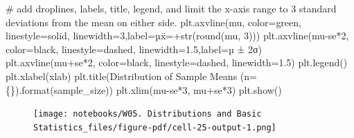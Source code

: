 \documentclass[
  letterpaper,
  DIV=11,
  numbers=noendperiod]{scrreprt}
\newenvironment{Shaded}{\begin{snugshade}}{\end{snugshade}}
\newcommand{\BuiltInTok}[1]{\textcolor[rgb]{0.00,0.23,0.31}{#1}}
\newcommand{\CommentTok}[1]{\textcolor[rgb]{0.37,0.37,0.37}{#1}}
\newcommand{\DecValTok}[1]{\textcolor[rgb]{0.68,0.00,0.00}{#1}}
\newcommand{\FloatTok}[1]{\textcolor[rgb]{0.68,0.00,0.00}{#1}}
\newcommand{\NormalTok}[1]{\textcolor[rgb]{0.00,0.23,0.31}{#1}}
\newcommand{\OperatorTok}[1]{\textcolor[rgb]{0.37,0.37,0.37}{#1}}
\newcommand{\SpecialCharTok}[1]{\textcolor[rgb]{0.37,0.37,0.37}{#1}}
\newcommand{\StringTok}[1]{\textcolor[rgb]{0.13,0.47,0.30}{#1}}
\begin{document}
\begin{Shaded}
\begin{Highlighting}[]
    \CommentTok{\# add droplines, labels, title, legend, and limit the x{-}axis range to 3 standard deviations from the mean on either side.}
\NormalTok{    plt.axvline(mu, color}\OperatorTok{=}\StringTok{\textquotesingle{}green\textquotesingle{}}\NormalTok{, linestyle}\OperatorTok{=}\StringTok{\textquotesingle{}solid\textquotesingle{}}\NormalTok{, linewidth}\OperatorTok{=}\DecValTok{3}\NormalTok{,label}\OperatorTok{=}\StringTok{\textquotesingle{}µx̄=\textquotesingle{}}\OperatorTok{+}\BuiltInTok{str}\NormalTok{(}\BuiltInTok{round}\NormalTok{(mu, }\DecValTok{3}\NormalTok{)))}
\NormalTok{    plt.axvline(mu}\OperatorTok{{-}}\NormalTok{se}\OperatorTok{*}\DecValTok{2}\NormalTok{, color}\OperatorTok{=}\StringTok{\textquotesingle{}black\textquotesingle{}}\NormalTok{, linestyle}\OperatorTok{=}\StringTok{\textquotesingle{}dashed\textquotesingle{}}\NormalTok{, linewidth}\OperatorTok{=}\FloatTok{1.5}\NormalTok{,label}\OperatorTok{=}\StringTok{\textquotesingle{}µ ± 2σ\textquotesingle{}}\NormalTok{)}
\NormalTok{    plt.axvline(mu}\OperatorTok{+}\NormalTok{se}\OperatorTok{*}\DecValTok{2}\NormalTok{, color}\OperatorTok{=}\StringTok{\textquotesingle{}black\textquotesingle{}}\NormalTok{, linestyle}\OperatorTok{=}\StringTok{\textquotesingle{}dashed\textquotesingle{}}\NormalTok{, linewidth}\OperatorTok{=}\FloatTok{1.5}\NormalTok{)}
\NormalTok{    plt.legend()}
\NormalTok{    plt.xlabel(xlab)    }
\NormalTok{    plt.title(}\StringTok{\textquotesingle{}Distribution of Sample Means (n=}\SpecialCharTok{\{\}}\StringTok{)\textquotesingle{}}\NormalTok{.}\BuiltInTok{format}\NormalTok{(sample\_size))}
\NormalTok{    plt.xlim(mu}\OperatorTok{{-}}\NormalTok{se}\OperatorTok{*}\DecValTok{3}\NormalTok{, mu}\OperatorTok{+}\NormalTok{se}\OperatorTok{*}\DecValTok{3}\NormalTok{)}
\NormalTok{    plt.show()  }
\end{Highlighting}
\end{Shaded}

\begin{Shaded}
\end{Shaded}

\begin{figure}[H]

{\centering \texttt{[image: notebooks/W05. Distributions and Basic Statistics\_files/figure-pdf/cell-25-output-1.png]}

}

\end{figure}
\end{document}
